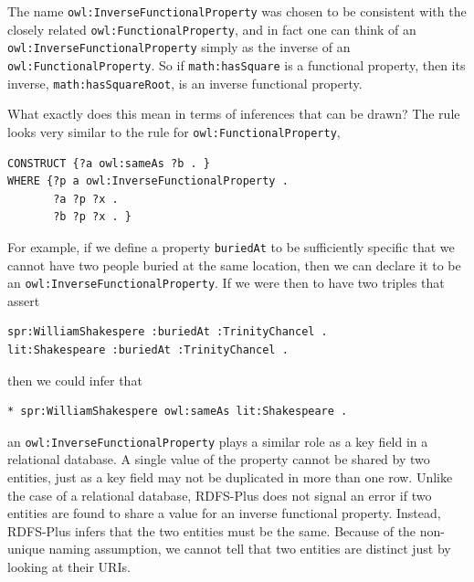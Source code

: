 The name \texttt{owl:InverseFunctionalProperty} was chosen to be consistent with
the closely related \texttt{owl:FunctionalProperty}, and in fact one can think of
an \texttt{owl:InverseFunctionalProperty} simply as the inverse of an
\texttt{owl:FunctionalProperty}. So if \texttt{math:hasSquare} is a functional property,
then its inverse, \texttt{math:hasSquareRoot}, is an inverse functional
property.

What exactly does this mean in terms of inferences that can be drawn?
The rule looks very similar to the rule for \texttt{owl:FunctionalProperty},

\begin{lstlisting}
CONSTRUCT {?a owl:sameAs ?b . }
WHERE {?p a owl:InverseFunctionalProperty .
       ?a ?p ?x .
       ?b ?p ?x . }
\end{lstlisting}

For example, if we define a property \texttt{buriedAt} to be sufficiently
specific that we cannot have two people buried at the same location,
then we can declare it to be an \texttt{owl:InverseFunctionalProperty}. If we
were then to have two triples that assert

\begin{lstlisting}
spr:WilliamShakespere :buriedAt :TrinityChancel .
lit:Shakespeare :buriedAt :TrinityChancel .
\end{lstlisting}

then we could infer that

\begin{lstlisting}
* spr:WilliamShakespere owl:sameAs lit:Shakespeare .
\end{lstlisting}

an \texttt{owl:InverseFunctionalProperty} plays a similar role as a key field in
a relational database. A single value of the property cannot be shared
by two entities, just as a key field may not be
duplicated in more than one row. Unlike the case of a relational
database, RDFS-Plus does not signal an error if two entities are found
to share a value for an inverse functional property. Instead, RDFS-Plus
infers that the two entities must be the same. Because of the non-unique
naming assumption, we cannot tell that two entities are distinct just by
looking at their URIs.

